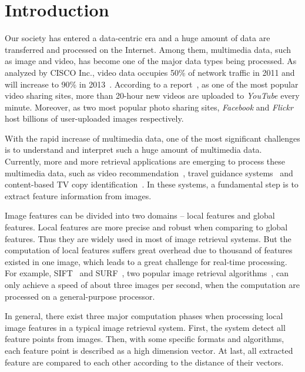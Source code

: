 \section{Introduction}

Our society has entered a data-centric era and a huge amount of data are transferred and processed on the Internet. Among them, multimedia data, such as image and video, has become one of the major data types being processed. As analyzed by CISCO Inc., video data occupies 50\% of network traffic in 2011 and will increase to 90\% in 2013~\cite{CISCO2011}.  According to a report~\cite{youtube2009}, as one of the most popular video sharing sites, more than 20-hour new videos are uploaded to \emph{YouTube} every minute. Moreover, as two most popular photo sharing sites, \emph{Facebook} and \emph{Flickr} host billions of user-uploaded images respectively.

With the rapid increase of multimedia data, one of the most significant challenges is to understand and interpret such a huge amount of multimedia data. Currently, more and more retrieval applications are emerging to process these multimedia data, such as video recommendation~\cite{videorecommendation2007}, travel guidance systems~\cite{travelguidance2010} and content-based TV copy identification~\cite{tvidentify2003}. In these systems, a fundamental step is to extract feature information from images. 

Image features can be divided into two domains -- local features and global features. Local features are more precise and robust when comparing to global features. Thus they are widely used in most of image retrieval systems. But the computation of local features suffers great overhead due to thousand of features existed in one image, which leads to a great challenge for real-time processing. For example, SIFT~\cite{Lowe2004SIFT} and SURF~\cite{Bay2006SURF}, two popular image retrieval algorithms~\cite{Mikolajczyk2005Evaluation}\cite{Bauer2007Evaluation}, can only achieve a speed of about three images per second, when the computation are processed on a general-purpose processor.

In general, there exist three major computation phases when processing local image features in a typical image retrieval system. First, the system detect all feature points from images. Then, with some specific formats and algorithms, each feature point is described as a high dimension vector. At last, all extracted feature are compared to each other according to the distance of their vectors.

